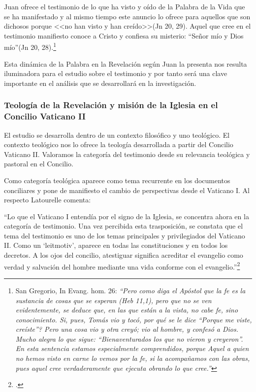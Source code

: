 \documentclass[12pt]{article}
\begin{document}
{Juan ofrece el testimonio de lo que ha visto y oído de la Palabra de la Vida que se ha manifestado y al mismo tiempo este anuncio lo ofrece para aquellos que son dichosos porque <<no han visto y han creído>>(Jn 20, 29). Aquel que cree en el testimonio manifiesto conoce a Cristo y confiesa su misterio: ``Señor mío y Dios mío''(Jn 20, 28).\footnote{San Gregorio, In Evang. hom. 26: \emph{``Pero como diga el Apóstol que la fe es la sustancia de cosas que se esperan (Heb 11,1), pero que no se ven evidentemente, se deduce que, en las que están a la vista, no cabe fe, sino conocimiento. Si, pues, Tomás vio y tocó, \textquestiondown por qué se le dice ``Porque me viste, creíste''? Pero una cosa vio y otra creyó; vio al hombre, y confesó a Dios. Mucho alegra lo que sigue: ``Bienaventurados los que no vieron y creyeron''. En esta sentencia estamos especialmente comprendidos, porque Aquel a quien no hemos visto en carne lo vemos por la fe, si la acompañamos con las obras, pues aquel cree verdaderamente que ejecuta obrando lo que cree.''}
}

Esta dinámica de la Palabra en la Revelación según Juan la presenta nos resulta iluminadora para el estudio sobre el testimonio y por tanto será una clave importante en el análisis que se desarrollará en la investigación.

\subsubsection{Teología de la Revelación y misión de la Iglesia en el Concilio Vaticano II}

El estudio se desarrolla dentro de un contexto filosófico y uno teológico. El contexto teológico nos lo ofrece la teología desarrollada a partir del Concilio Vaticano II. Valoramos la categoría del testimonio desde su relevancia teológica y pastoral en el Concilio. 

Como categoría teológica aparece como tema recurrente en los documentos conciliares y pone de manifiesto el cambio de perspectivas desde el Vaticano I. Al respecto Latourelle comenta:

``Lo que el Vaticano I entendía por el signo de la Iglesia, se concentra ahora en la categoría de testimonio. Una vez percibida esta trasposición, se constata que el tema del testimonio es uno de los temas principales y privilegiados del Vaticano II. Como un `leitmotiv', aparece en todas las constituciones y en todos los decretos. A los ojos del concilio, atestiguar significa acreditar el evangelio como verdad y salvación del hombre mediante una vida conforme con el evangelio.''\footcite[1532]{dicctf}

}
\end{document}
